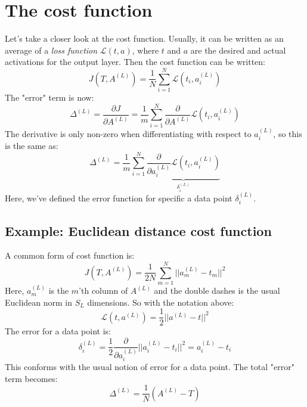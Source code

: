 \documentclass[12pt, a4paper]{article}
\numberwithin{equation}{section}
\begin{document}
\section{The cost function}
Let's take a closer look at the cost function. Usually, it can be written as an average of a \textit{loss function} $\mathcal{L}(t,a)$, where $t$ and $a$ are the desired and actual activations for the output layer. Then the cost function can be written:
\begin{equation}
J(T,A^{(L)})=\frac{1}{N}\sum_{i=1}^N\mathcal{L}(t_i,a^{(L)}_i)
\end{equation}
The "error" term is now:
\begin{equation}
\Delta^{(L)}=\frac{\partial J}{\partial A^{(L)}}=\frac{1}{m}\sum_{i=1}^N\frac{\partial}{\partial A^{(L)}}\mathcal{L}(t_i,a^{(L)}_i)
\end{equation}
The derivative is only non-zero when differentiating with respect to $a^{(L)}_i$, so this is the same as:
\begin{equation}
\Delta^{(L)}=\frac{1}{m}\sum_{i=1}^N\underbrace{\frac{\partial}{\partial a^{(L)}_i}\mathcal{L}(t_i,a^{(L)}_i)}_{\delta^{(L)}_i}
\end{equation}
Here, we've defined the error function for specific a data point $\delta^{(L)}_i$.

\subsection{Example: Euclidean distance cost function}
A common form of cost function is:
\begin{equation}
J(T,A^{(L)})=\frac{1}{2N}\sum_{m=1}^N||a^{(L)}_m-t_m||^2
\end{equation}
Here, $a^{(L)}_m$ is the $m$'th column of $A^{(L)}$ and the double dashes is the usual Euclidean norm in $S_L$ dimensions. So with the notation above:
\begin{equation}
\mathcal{L}(t,a^{(L)})=\frac{1}{2}||a^{(L)}-t||^2
\end{equation}
The error for a data point is:
\begin{equation}
\delta^{(L)}_i=\frac{1}{2}\frac{\partial}{\partial a^{(L)}_i}||a^{(L)}_i-t_i||^2=a^{(L)}_i-t_i
\end{equation}
This conforms with the usual notion of error for a data point. The total "error" term becomes:
\begin{equation}
\Delta^{(L)}=\frac{1}{N}\left(A^{(L)}-T\right)
\end{equation}
\end{document}
